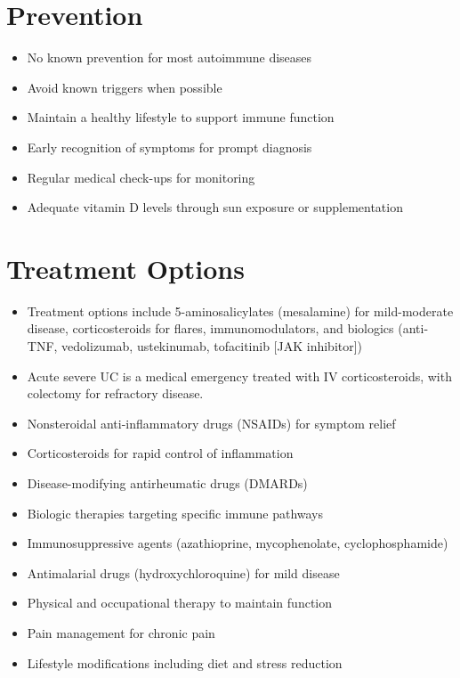 \section{Prevention}
\begin{itemize}[noitemsep]
  \item No known prevention for most autoimmune diseases
  \item Avoid known triggers when possible
  \item Maintain a healthy lifestyle to support immune function
  \item Early recognition of symptoms for prompt diagnosis
  \item Regular medical check-ups for monitoring
  \item Adequate vitamin D levels through sun exposure or supplementation
\end{itemize}
\section{Treatment Options}
\begin{itemize}[noitemsep]
  \item Treatment options include 5-aminosalicylates (mesalamine) for mild-moderate disease, corticosteroids for flares, immunomodulators, and biologics (anti-TNF, vedolizumab, ustekinumab, tofacitinib [JAK inhibitor])
  \item Acute severe UC is a medical emergency treated with IV corticosteroids, with colectomy for refractory disease.
  \item Nonsteroidal anti-inflammatory drugs (NSAIDs) for symptom relief
  \item Corticosteroids for rapid control of inflammation
  \item Disease-modifying antirheumatic drugs (DMARDs)
  \item Biologic therapies targeting specific immune pathways
  \item Immunosuppressive agents (azathioprine, mycophenolate, cyclophosphamide)
  \item Antimalarial drugs (hydroxychloroquine) for mild disease
  \item Physical and occupational therapy to maintain function
  \item Pain management for chronic pain
  \item Lifestyle modifications including diet and stress reduction
\end{itemize}
